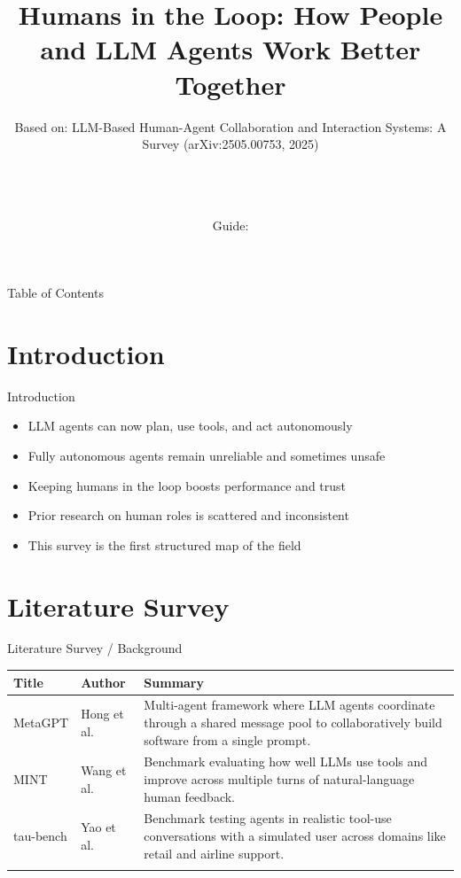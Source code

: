 \documentclass[10pt]{beamer}
\title[B.Tech Seminar]{Humans in the Loop: How People and LLM Agents Work Better Together}
\subtitle{Based on: LLM-Based Human-Agent Collaboration and Interaction Systems: A Survey (arXiv:2505.00753, 2025)}
\author[\studentname\ (\shortinst)]{\studentname \\ \small \rollno \\ \small \rollclass \\ \small Guide: \guidename}
\institute[]{\deptname \\ \collegename}
\date{\seminardate}
\begin{document}
\begin{frame}[plain]
  \titlepage
\end{frame}

\begin{frame}{Table of Contents}
  \tableofcontents
\end{frame}

\section{Introduction}
\begin{frame}{Introduction}
\begin{itemize}
  \item LLM agents can now plan, use tools, and act autonomously
  \item Fully autonomous agents remain unreliable and sometimes unsafe
  \item Keeping humans in the loop boosts performance and trust
  \item Prior research on human roles is scattered and inconsistent
  \item This survey is the first structured map of the field
\end{itemize}
\end{frame}

\section{Literature Survey}
\begin{frame}{Literature Survey / Background}
  \small
  \begin{tabular}{@{}p{2.7cm}p{2.3cm}p{5.6cm}@{}}
    \toprule
    \textbf{Title} & \textbf{Author} & \textbf{Summary} \\
    \midrule
    MetaGPT & Hong et al. & Multi-agent framework where LLM agents coordinate through a shared message pool to collaboratively build software from a single prompt. \\
    \addlinespace
    MINT & Wang et al. & Benchmark evaluating how well LLMs use tools and improve across multiple turns of natural-language human feedback. \\
    \addlinespace
    tau-bench & Yao et al. & Benchmark testing agents in realistic tool-use conversations with a simulated user across domains like retail and airline support. \\
    \addlinespace
    \bottomrule
  \end{tabular}
\end{frame}
\end{document}
